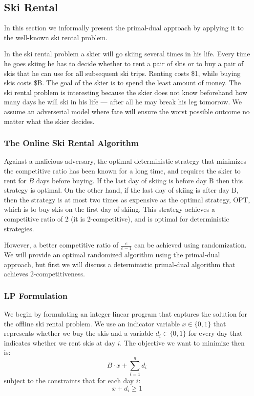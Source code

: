 \subsection{Ski Rental}

In this section we informally present the primal-dual approach by applying it to the well-known ski rental problem.

In the ski rental problem a skier will go skiing several times in his life.
Every time he goes skiing he has to decide whether to rent a pair of skis or to buy a pair of skis that he can use for all subsequent ski trips.
Renting costs \$1, while buying skis costs \$B.
The goal of the skier is to spend the least amount of money.
The ski rental problem is interesting because the skier does not know beforehand how many days he will ski in his life --- after all he may break his leg tomorrow.
We assume an adverserial model where fate will ensure the worst possible outcome no matter what the skier decides.

\subsubsection{The Online Ski Rental Algorithm}
Against a malicious adversary, the optimal deterministic strategy that minimizes the competitive ratio has been known for a long time, and requires the skier to rent for $B$ days before buying.
If the last day of skiing is before day B then this strategy is optimal.
On the other hand, if the last day of skiing is after day B, then the strategy is at most two times as expensive as the optimal strategy, OPT, which is to buy skis on the first day of skiing.
This strategy achieves a competitive ratio of 2 (it is 2-competitive), and is optimal for deterministic strategies.

However, a better competitive ratio of $\frac{e}{e-1}$ can be achieved using randomization.
We will provide an optimal randomized algorithm using the primal-dual approach, but first we will discuss a deterministic primal-dual algorithm that achieves 2-competitiveness.

\subsubsection{LP Formulation}
We begin by formulating an integer linear program that captures the solution for the offline ski rental problem.
We use an indicator variable $x \in \{0,1\}$ that represents whether we buy the skis and a variable $d_i \in \{0,1\}$ for every day that indicates whether we rent skis at day $i$. 
The objective we want to minimize then is:
\[ B\cdot x + \sum^n_{i=1} d_i \]
subject to the constraints that for each day $i$:
\[ x + d_i \ge 1 \]

